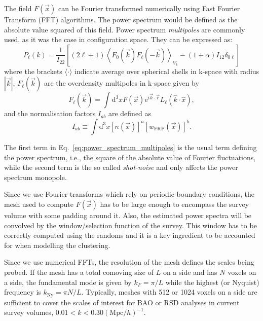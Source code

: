 The field $F(\vec{x})$ can be Fourier transformed numerically using Fast Fourier Transform (FFT) 
algorithms. The power spectrum would be defined as the absolute value squared of this field. 
Power spectrum \emph{multipoles} are commonly 
used, as it was the case in configuration space. 
They can be expressed as: 
\begin{equation}
 P_\ell(k) = \frac{1}{I_{22}} \left[ (2\ell+1) \left\langle F_0(\vec{k})F_\ell(-\vec{k}) \right\rangle_{V_k} - (1+\alpha)I_{12} \delta_{0\ell} \right]
 \label{eq:power_spectrum_multipoles}
\end{equation}
where the brackets $\langle \cdot \rangle$ indicate average over spherical shells in k-space with radius $|\vec{k}|$, 
$F_\ell(\vec{k})$ are the overdensity multipoles in k-space given by 
\begin{equation}
    F_\ell(\vec{k}) = \int \text{d}^3x F(\vec{x}) \text{e}^{i \vec{k}\cdot \vec{r}} L_\ell( \hat{k} \cdot \hat{x}), 
\end{equation}
and the normalisation factors $I_{ab}$ are defined as 
\begin{equation}
 I_{ab} \equiv \int \text{d}^3 x [n(\vec{x})]^a [w_\text{FKP}(\vec{x})]^b. 
 \label{eq:normalisation_power_spectrum}
\end{equation}

The first term in Eq.~\ref{eq:power_spectrum_multipoles} is the usual term defining the power spectrum, i.e., 
the square of the absolute value of Fourier fluctuations, while the second term is the so called \emph{shot-noise} 
and only affects the power spectrum monopole. 

Since we use Fourier transforms which rely on periodic boundary conditions, the mesh used to compute $F(\vec{x})$
has to be large enough to encompass the survey volume with some padding around it. 
Also, the estimated power spectra will be convolved by the window/selection function of the survey.
This window has to be correctly computed using the randoms and 
it is a key ingredient to be accounted for when modelling the clustering. 

Since we use numerical FFTs, the resolution of the mesh defines the scales being probed. 
If the mesh has a total comoving size of $L$ on a side and has $N$ voxels on a side, 
the fundamental mode is given by $k_F = \pi/L$ while the highest (or Nyquist) frequency is $k_\text{Ny} = \pi N/L$. 
Typically, meshes with 512 or 1024 voxels on a side are sufficient to cover the scales of interest 
for BAO or RSD analyses in current survey volumes, $0.01 < k < 0.30 (\text{Mpc}/h)^{-1}$. 


